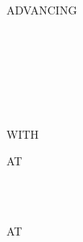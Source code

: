 \begin{syntax}
   \recordname
  \begin{0-1}
    \begin{1=}
      \identifier \\
      \literal \\
      \functionname
    \end{1=}
  \end{0-1}

  \begin{0-1}
    \begin{1=}
       \\
    \end{1=}
    ADVANCING
    \begin{1=}
      \begin{1=}
        \identifier \\
        \literal
      \end{1=}
      \begin{0-1}
         \\
      \end{0-1} \\

      \mnemonicname \\

    \end{1=}
  \end{0-1}

  \begin{0-1}
  \end{0-1}
  \begin{0-1}
    WITH
    \begin{0-1}
    \end{0-1}
  \end{0-1}

  \begin{0+}
    AT
    \begin{1=}
       \\
    \end{1=}
    \imperativestatement \\

     AT
    \begin{1=}
       \\
    \end{1=}
    \imperativestatement
  \end{0+}

  \begin{0-1}
  \end{0-1}
\end{syntax}


